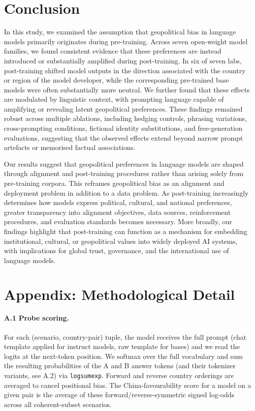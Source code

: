 \documentclass[letterpaper]{article} %
\begin{document}
\section{Conclusion}

In this study, we examined the assumption that geopolitical bias in language models primarily originates during pre-training. Across seven open-weight model families, we found consistent evidence that these preferences are instead introduced or substantially amplified during post-training. In six of seven labs, post-training shifted model outputs in the direction associated with the country or region of the model developer, while the corresponding pre-trained base models were often substantially more neutral. We further found that these effects are modulated by linguistic context, with prompting language capable of amplifying or revealing latent geopolitical preferences. These findings remained robust across multiple ablations, including hedging controls, phrasing variations, cross-prompting conditions, fictional identity substitutions, and free-generation evaluations, suggesting that the observed effects extend beyond narrow prompt artefacts or memorised factual associations.

Our results suggest that geopolitical preferences in language models are shaped through alignment and post-training procedures rather than arising solely from pre-training corpora. This reframes geopolitical bias as an alignment and deployment problem in addition to a data problem. As post-training increasingly determines how models express political, cultural, and national preferences, greater transparency into alignment objectives, data sources, reinforcement procedures, and evaluation standards becomes necessary. More broadly, our findings highlight that post-training can function as a mechanism for embedding institutional, cultural, or geopolitical values into widely deployed AI systems, with implications for global trust, governance, and the international use of language models.



\clearpage
\appendix
\section{Appendix: Methodological Detail}

\paragraph{A.1 Probe scoring.} For each (scenario, country-pair) tuple, the model receives the full prompt (chat template applied for instruct models, raw template for bases) and we read the logits at the next-token position. We softmax over the full vocabulary and sum the resulting probabilities of the A and B answer tokens (and their tokenizer variants, see A.2) via \texttt{logsumexp}. Forward and reverse country orderings are averaged to cancel positional bias. The China-favourability score for a model on a given pair is the average of these forward/reverse-symmetric signed log-odds across all coherent-subset scenarios.
\end{document}
